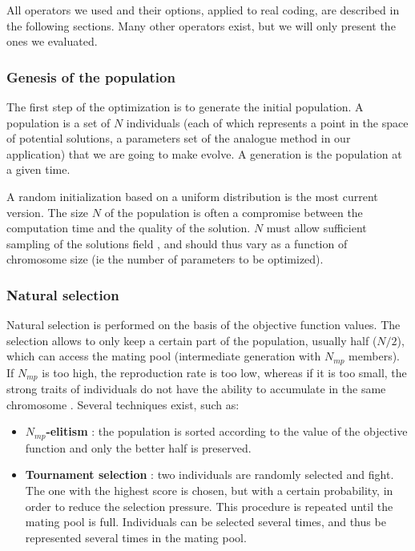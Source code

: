 \documentclass[twocol]{ametsoc}
\begin{document}
All operators we used and their options, applied to real coding, are described in the following sections. Many other operators exist, but we will only present the ones we evaluated.


\subsubsection{Genesis of the population}

The first step of the optimization is to generate the initial population. A population is a set of $N$ individuals (each of which represents a point in the space of potential solutions, a parameters set of the analogue method in our application) that we are going to make evolve. A generation is the population at a given time. 

A random initialization based on a uniform distribution is the most current version. The size $N$ of the population is often a compromise between the computation time and the quality of the solution. $N$ must allow sufficient sampling of the solutions field \citep{Beasley1996a}, and should thus vary as a function of chromosome size (ie the number of parameters to be optimized). 


\subsubsection{Natural selection}

Natural selection is performed on the basis of the objective function values. The selection allows to only keep a certain part of the population, usually half ($N/2$), which can access the mating pool (intermediate generation with $N_{mp}$ members). If $N_{mp}$ is too high, the reproduction rate is too low, whereas if it is too small, the strong traits of individuals do not have the ability to accumulate in the same chromosome \citep{Haupt2004}. Several techniques exist, such as:

\begin{itemize}
	\item \textbf{$N_{mp}$-elitism} \citep{Michalewicz1996}: the population is sorted according to the value of the objective function and only the better half is preserved. 
		
	\item \textbf{Tournament selection} \citep{Michalewicz1996, Zitzler2004a}: two individuals are randomly selected and fight. The one with the highest score is chosen, but with a certain probability, in order to reduce the selection pressure. This procedure is repeated until the mating pool is full. Individuals can be selected several times, and thus be represented several times in the mating pool.
\end{itemize}
\end{document}
